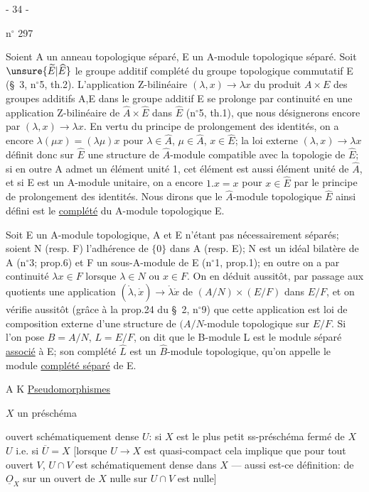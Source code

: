 \begin{center}- 34 -\end{center}
\hfill n$^\circ$ 297

Soient A un anneau topologique séparé, E un A-module topologique séparé. Soit $\unsure{\widetilde E|\widehat E}$ le groupe additif complété du groupe topologique commutatif E (\S\ 3, n$^\circ$5, th.2). L'application Z-bilinéaire $(\lambda,x)\longrightarrow\lambda x$ du produit $A\times E$ des groupes additifs A,E dans le groupe additif E se prolonge par continuité en une application Z-bilinéaire de $\widehat A\times\widehat E$ dans $\widehat E$ (n$^\circ$5, th.1), que nous désignerons encore par $(\lambda,x)\longrightarrow\lambda x$. En vertu du principe de prolongement des identités, on a encore $\lambda(\mu x)=(\lambda\mu)x$ pour $\lambda\in\widehat A$, $\mu\in\widehat A$, $x\in\widehat E$; la loi externe $(\lambda,x)\longrightarrow\lambda x$ définit donc sur $\widehat E$ une structure de $\widehat A$-module compatible avec la topologie de $\widehat E$; si en outre A admet un élément unité 1, cet élément est aussi élément unité de $\widehat A$, et si E est un A-module unitaire, on a encore $1.x=x$ pour $x\in\widehat E$ par le principe de prolongement des identités. Nous dirons que le $\widehat A$-module topologique $\widehat E$ ainsi défini est le \uline{complété} du A-module topologique E.

Soit E un A-module topologique, A et E n'étant pas nécessairement séparés; soient N (resp. F) l'adhérence de $\{0\}$ dans A (resp. E); N est un idéal bilatère de A (n$^\circ$3; prop.6) et F un sous-A-module de E (n$^\circ$1, prop.1); en outre on a par continuité $\lambda x\in F$ lorsque $\lambda\in N$ ou $x\in F$. On en déduit aussitôt, par passage aux quotients une application $(\mathring\lambda,\mathring x)\longrightarrow\mathring\lambda\mathring x$ de $(A/N)\times(E/F)$ dans $E/F$, et on vérifie aussitôt (grâce à la prop.24 du \S\ 2, n$^\circ$9) que cette application est loi de composition externe d'une structure de $(A/N$-module topologique sur $E/F$. Si l'on pose $B=A/N$, $L=E/F$, on dit que le B-module L est le module séparé \uline{associé} à E; son complété $\widehat L$ est un $\widehat B$-module topologique, qu'on appelle le module \uline{complété séparé} de E.

A K
\hfill\uline{Pseudomorphismes}

$X$ un préschéma

ouvert schématiquement dense $U$: si $X$ est le plus petit ss-préschéma fermé de $X$  $U$ i.e. si $\overline U=X$ [lorsque $U\to X$ est quasi-compact cela implique que pour tout ouvert $V$, $U\cap V$ est schématiquement dense dans $X$ --- aussi est-ce  définition:  \uline{} de $\underline O_X$ sur un ouvert de $X$ nulle sur $U\cap V$ est nulle]

